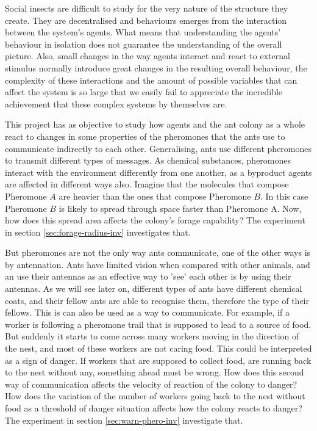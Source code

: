 Social insects are difficult to study for the very nature of the structure they create. They are decentralised and behaviours emerges from the interaction between the system's agents. What means that understanding the agents' behaviour in isolation does not guarantee the understanding of the overall picture. Also, small changes in the way agents interact and react to external stimulus normally introduce great changes in the resulting overall behaviour, the complexity of these interactions and the amount of possible variables that can affect the system is so large that we easily fail to appreciate the incredible achievement that these complex systems by themselves are.

This project has as objective to study how agents and the ant colony as a whole react to changes in some properties of the pheromones that the ants use to communicate indirectly to each other. Generalising, ants use different pheromones to transmit different types of messages. As chemical substances, pheromones interact with the environment differently from one another, as a byproduct agents are affected in different ways also. Imagine that the molecules that compose Pheromone $A$ are heavier than the ones that compose Pheromone $B$. In this case Pheromone $B$ is likely to spread through space faster than Pheromone A. Now, how does this spread area affects the colony's forage capability? The experiment in section \ref{sec:forage-radius-inv} investigates that. 

But pheromones are not the only way ants communicate, one of the other ways is by antennation. Ants have limited vision when compared with other animals, and an use their antennas as an effective way to 'see' each other is by using their antennas. As we will see later on, different types of ants have different chemical coats, and their fellow ants are able to recognise them, therefore the type of their fellows. This is can also be used as a way to communicate. For example, if a worker is following a pheromone trail that is supposed to lead to a source of food. But suddenly it starts to come across many workers moving in the direction of the nest, and most of these workers are not caring food. This could be interpreted as a sign of danger. If workers that are supposed to collect food, are running back to the nest without any, something ahead must be wrong. How does this second way of communication affects the velocity of reaction of the colony to danger? How does the variation of the number of workers going back to the nest without food as a threshold of danger situation affects how the colony reacts to danger? The experiment in section \ref{sec:warn-phero-inv} investigate that. 

